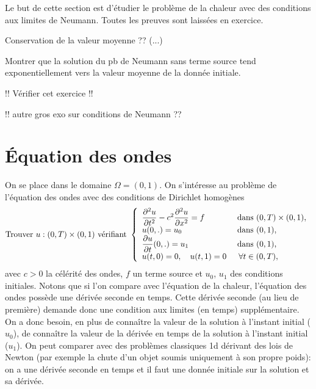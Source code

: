 \documentclass[12pt,a4paper,twoside]{article}
\begin{document}
Le but de cette section est d'\'etudier le probl\`eme de la chaleur
avec des conditions aux limites de Neumann.
Toutes les preuves sont laiss\'ees en exercice.




\begin{remark}
  Conservation de la valeur moyenne ??
  (...)
\end{remark}


\begin{exercise}
  Montrer que la solution du pb de Neumann sans terme source
  tend exponentiellement vers la valeur moyenne de la donn\'ee initiale.
\end{exercise}

!! V\'erifier cet exercice !!




!! autre gros exo sur conditions de Neumann ??

\section{\'Equation des ondes}

On se place dans le domaine $\Omega = (0,1)$.
On s'int\'eresse au probl\`eme de l'\'equation des ondes avec des conditions de Dirichlet homog\`enes
\begin{equation}
  \label{eq:ondes_Dir}
  \text{Trouver $u : (0,T) \times (0,1)$ v\'erifiant }
  \left\{
    \begin{array}{l l}
      \dfrac{\partial^2 u}{\partial t^2} - c^2 \dfrac{\partial^2 u}{\partial x^2} = f 
      &\text{ dans } (0,T) \times (0,1) ,
      \\
      u(0,.) = u_0 
      & \text{ dans } (0,1) ,
      \\
      \dfrac{\partial u}{\partial t}(0,.) = u_1 
      & \text{ dans } (0,1) ,
      \\
      u(t,0) = 0 , \quad u(t,1) = 0 & \;\: \forall t \in (0,T) ,
    \end{array}
  \right.
\end{equation}
avec $c>0$ la c\'el\'erit\'e des ondes, $f$ un terme source et $u_0$, $u_1$ des conditions initiales.
Notons que si l'on compare avec l'\'equation de la chaleur,
l'\'equation des ondes poss\`ede une d\'eriv\'ee seconde en temps.
Cette d\'eriv\'ee seconde (au lieu de premi\`ere) demande donc une
condition aux limites (en temps) suppl\'ementaire.
On a donc besoin, en plus de conna\^itre la valeur de la solution \`a l'instant initial ($u_0$),
de conna\^itre la valeur de la d\'eriv\'ee en temps de la solution \`a l'instant initial ($u_1$).
On peut comparer avec des probl\`emes classiques 1d d\'erivant des lois de Newton
(par exemple la chute d'un objet soumis uniquement \`a son propre poids):
on a une d\'eriv\'ee seconde en temps et il faut une donn\'ee initiale sur la solution
et sa d\'eriv\'ee.
\end{document}
